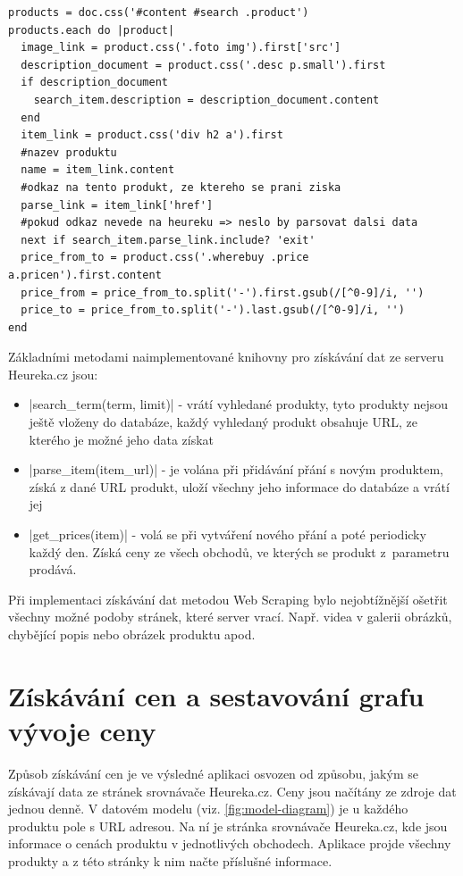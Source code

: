\begin{lstlisting}
products = doc.css('#content #search .product')
products.each do |product|
  image_link = product.css('.foto img').first['src']
  description_document = product.css('.desc p.small').first
  if description_document
    search_item.description = description_document.content
  end
  item_link = product.css('div h2 a').first
  #nazev produktu
  name = item_link.content
  #odkaz na tento produkt, ze ktereho se prani ziska
  parse_link = item_link['href']
  #pokud odkaz nevede na heureku => neslo by parsovat dalsi data
  next if search_item.parse_link.include? 'exit'
  price_from_to = product.css('.wherebuy .price a.pricen').first.content
  price_from = price_from_to.split('-').first.gsub(/[^0-9]/i, '')
  price_to = price_from_to.split('-').last.gsub(/[^0-9]/i, '')
end
\end{lstlisting}

Základními metodami naimplementované knihovny pro získávání dat ze serveru Heureka.cz jsou:

\begin{itemize}
\item |search_term(term, limit)| - vrátí vyhledané produkty, tyto produkty nejsou ještě vloženy do databáze, každý vyhledaný produkt obsahuje URL, ze kterého je možné jeho data získat
\item |parse_item(item_url)| - je volána při přidávání přání s novým produktem, získá z dané URL produkt, uloží všechny jeho informace do databáze a vrátí jej
\item |get_prices(item)| - volá se při vytváření nového přání a poté periodicky každý den. Získá ceny ze všech obchodů, ve kterých se produkt z~parametru prodává.
\end{itemize}

Při implementaci získávání dat metodou Web Scraping bylo nejobtížnější ošetřit všechny možné podoby stránek, které server vrací. Např. videa v galerii obrázků, chybějící popis nebo obrázek produktu apod.

\section{Získávání cen a sestavování grafu vývoje ceny}
Způsob získávání cen je ve výsledné aplikaci osvozen od způsobu, jakým se získávají data ze stránek srovnávače Heureka.cz. Ceny jsou načítány ze zdroje dat jednou denně. V datovém modelu (viz. \ref{fig:model-diagram}) je u každého produktu pole s URL adresou. Na ní je stránka srovnávače Heureka.cz, kde jsou informace o cenách produktu v jednotlivých obchodech. Aplikace projde všechny produkty a z této stránky k nim načte příslušné informace.

